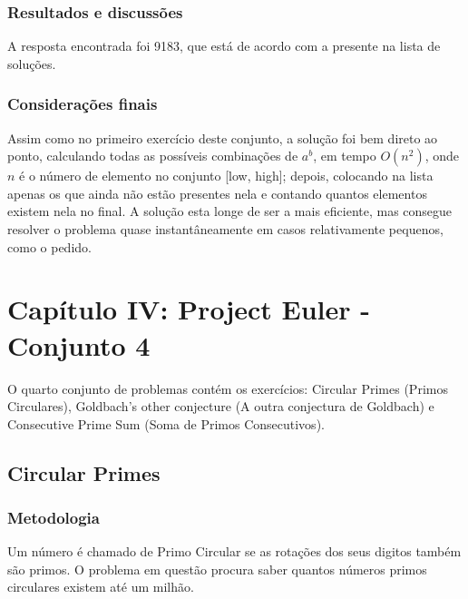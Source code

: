 \documentclass{article}
\begin{document}
        \subsubsection{Resultados e discussões}
        A resposta encontrada foi 9183, que está de acordo com a presente na lista de soluções.
        
        \subsubsection{Considerações finais}
        Assim como no primeiro exercício deste conjunto, a solução foi bem direto ao ponto, calculando todas as possíveis combinações de $a^b$, em tempo $O(n^2)$, onde $n$ é o número de elemento no conjunto [low, high]; depois, colocando na lista apenas os que ainda não estão presentes nela e contando quantos elementos existem nela no final. A solução esta longe de ser a mais eficiente, mas consegue resolver o problema quase instantâneamente em casos relativamente pequenos, como o pedido.
\clearpage

\section{Capítulo IV: Project Euler - Conjunto 4}
O quarto conjunto de problemas contém os exercícios: Circular Primes (Primos Circulares), Goldbach's other conjecture (A outra conjectura de Goldbach) e Consecutive Prime Sum (Soma de Primos Consecutivos).
    
    \subsection{Circular Primes}
        
        \subsubsection{Metodologia}
        Um número é chamado de Primo Circular se as rotações dos seus digitos também são primos. O problema em questão procura saber quantos números primos circulares existem até um milhão.
        
\end{document}
